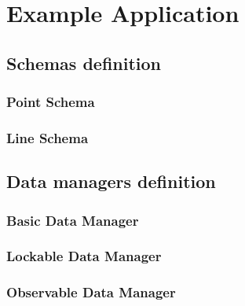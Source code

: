 \chapter{Example Application}\label{Example Application}

\section{Schemas definition}

\subsection{Point Schema}

\subsection{Line Schema}

\section{Data managers definition}

\subsection{Basic Data Manager}

\subsection{Lockable Data Manager}

\subsection{Observable Data Manager}

